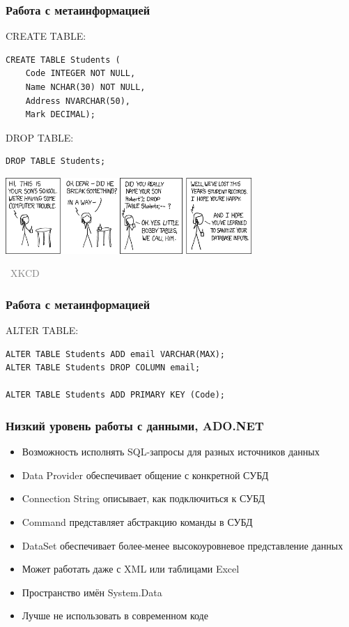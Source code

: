 \documentclass[xetex,mathserif,serif]{beamer}
\newcommand{\attribution}[1] {
\vspace{-5mm}\begin{flushright}\begin{scriptsize}\textcolor{gray}{\textcopyright\, #1}\end{scriptsize}\end{flushright}
}
\begin{document}
	\begin{frame}[fragile]
		\frametitle{Работа с метаинформацией}
		\begin{small}
			CREATE TABLE:
			\begin{verbatim}
CREATE TABLE Students (
    Code INTEGER NOT NULL,
    Name NCHAR(30) NOT NULL,
    Address NVARCHAR(50),
    Mark DECIMAL);
			\end{verbatim}

			\vspace{3mm}
			DROP TABLE:
			\begin{verbatim}
DROP TABLE Students;
			\end{verbatim}
		\end{small}

		\begin{center}
			\includegraphics[width=0.7\textwidth]{bobbyTables.png}
			\attribution{XKCD}
		\end{center}
	\end{frame}

	\begin{frame}[fragile]
		\frametitle{Работа с метаинформацией}
		ALTER TABLE:
		\begin{verbatim}
ALTER TABLE Students ADD email VARCHAR(MAX);
ALTER TABLE Students DROP COLUMN email;

ALTER TABLE Students ADD PRIMARY KEY (Code);

		\end{verbatim}
	\end{frame}

	\begin{frame}
		\frametitle{Низкий уровень работы с данными, ADO.NET}
		\begin{itemize}
			\item Возможность исполнять SQL-запросы для разных источников данных
			\item Data Provider обеспечивает общение с конкретной СУБД
			\item Connection String описывает, как подключиться к СУБД
			\item Command представляет абстракцию команды в СУБД
			\item DataSet обеспечивает более-менее высокоуровневое представление данных
			\item Может работать даже с XML или таблицами Excel
			\item Пространство имён System.Data
			\item Лучше не использовать в современном коде
		\end{itemize}
	\end{frame}
\end{document}
